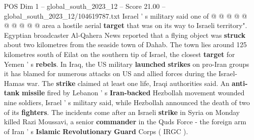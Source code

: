 \begin{textsample}{POS Dim 1 – global\_south\_2023\_12 – Score 21.00 – global\_south\_2023\_12/104619787.txt}
Israel ' s military said one of @ @ @ @ @ @ @ @ @ @ area a hostile aerial \textbf{target} that was on its way to Israeli territory".
Egyptian broadcaster Al-Qahera News reported that a flying object was \textbf{struck} about two kilometres from the seaside town of Dahab.
The town lies around 125 kilometres south of Eilat on the southern tip of Israel, the closest \textbf{target} for Yemen ' s \textbf{rebels}.
In Iraq, the US military \textbf{launched} \textbf{strikes} on pro-Iran groups it has blamed for numerous attacks on US and allied forces during the Israel-Hamas war.
The \textbf{strike} claimed at least one life, Iraqi authorities said.
An \textbf{anti-tank} \textbf{missile} fired by Lebanon ' s \textbf{Iran-backed} Hezbollah movement wounded nine soldiers, Israel ' s military said, while Hezbollah announced the death of two of its \textbf{fighters}.
The incidents come after an Israeli \textbf{strike} in Syria on Monday killed Razi Moussavi, a senior \textbf{commander} in the Quds Force - the foreign arm of Iran ' s \textbf{Islamic} \textbf{Revolutionary} \textbf{Guard} Corps ( IRGC ).

\end{textsample}
